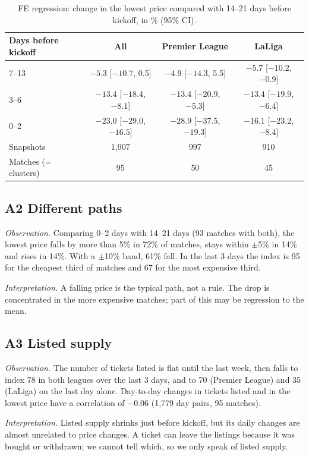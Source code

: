\documentclass[11pt,a4paper]{article}
\newcommand{\obs}{\par\noindent\textit{Observation.} }
\newcommand{\interp}{\par\noindent\textit{Interpretation.} }
\begin{document}
\begin{table}[htbp]
\centering
\caption{FE regression: change in the lowest price compared with 14--21 days before kickoff, in \% (95\% CI).}
\label{tab:fe}
\begin{tabular}{lccc}
\toprule
Days before kickoff & All & Premier League & LaLiga \\
\midrule
7--13 & $-5.3$ [$-10.7$, 0.5] & $-4.9$ [$-14.3$, 5.5] & $-5.7$ [$-10.2$, $-0.9$] \\
3--6 & $-13.4$ [$-18.4$, $-8.1$] & $-13.4$ [$-20.9$, $-5.3$] & $-13.4$ [$-19.9$, $-6.4$] \\
0--2 & $-23.0$ [$-29.0$, $-16.5$] & $-28.9$ [$-37.5$, $-19.3$] & $-16.1$ [$-23.2$, $-8.4$] \\
\midrule
Snapshots & 1,907 & 997 & 910 \\
Matches (= clusters) & 95 & 50 & 45 \\
\bottomrule
\end{tabular}
\end{table}

\subsection*{A2 Different paths}
\obs Comparing 0--2 days with 14--21 days (93 matches with both), the lowest price falls by more than 5\% in 72\% of matches, stays within $\pm$5\% in 14\% and rises in 14\%. With a $\pm$10\% band, 61\% fall. In the last 3 days the index is 95 for the cheapest third of matches and 67 for the most expensive third.
\interp A falling price is the typical path, not a rule. The drop is concentrated in the more expensive matches; part of this may be regression to the mean.

\subsection*{A3 Listed supply}
\obs The number of tickets listed is flat until the last week, then falls to index 78 in both leagues over the last 3 days, and to 70 (Premier League) and 35 (LaLiga) on the last day alone. Day-to-day changes in tickets listed and in the lowest price have a correlation of $-0.06$ (1,779 day pairs, 95 matches).
\interp Listed supply shrinks just before kickoff, but its daily changes are almost unrelated to price changes. A ticket can leave the listings because it was bought or withdrawn; we cannot tell which, so we only speak of listed supply.
\end{document}
